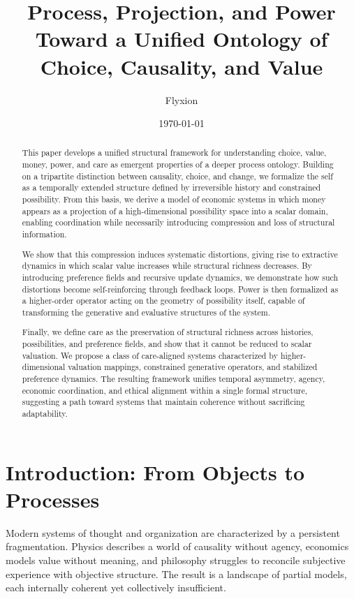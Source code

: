 \documentclass[11pt,a4paper]{article}
\title{\textbf{Process, Projection, and Power}\\[0.5em]
\normalsize Toward a Unified Ontology of Choice, Causality, and Value}
\author{Flyxion}
\date{\today}
\theoremstyle{definition}
\theoremstyle{remark}
\begin{document}
\maketitle

\begin{abstract}
This paper develops a unified structural framework for understanding choice, value, money, power, and care as emergent properties of a deeper process ontology. Building on a tripartite distinction between causality, choice, and change, we formalize the self as a temporally extended structure defined by irreversible history and constrained possibility. From this basis, we derive a model of economic systems in which money appears as a projection of a high-dimensional possibility space into a scalar domain, enabling coordination while necessarily introducing compression and loss of structural information.

We show that this compression induces systematic distortions, giving rise to extractive dynamics in which scalar value increases while structural richness decreases. By introducing preference fields and recursive update dynamics, we demonstrate how such distortions become self-reinforcing through feedback loops. Power is then formalized as a higher-order operator acting on the geometry of possibility itself, capable of transforming the generative and evaluative structures of the system.

Finally, we define care as the preservation of structural richness across histories, possibilities, and preference fields, and show that it cannot be reduced to scalar valuation. We propose a class of care-aligned systems characterized by higher-dimensional valuation mappings, constrained generative operators, and stabilized preference dynamics. The resulting framework unifies temporal asymmetry, agency, economic coordination, and ethical alignment within a single formal structure, suggesting a path toward systems that maintain coherence without sacrificing adaptability.
\end{abstract}

\newpage
\tableofcontents
\newpage

\section{Introduction: From Objects to Processes}

Modern systems of thought and organization are characterized by a persistent fragmentation. Physics describes a world of causality without agency, economics models value without meaning, and philosophy struggles to reconcile subjective experience with objective structure. The result is a landscape of partial models, each internally coherent yet collectively insufficient.
\end{document}
